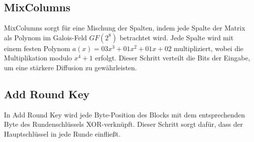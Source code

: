 \subsection{MixColumns}
MixColumns sorgt für eine Mischung der Spalten, indem jede Spalte der Matrix als Polynom im Galois-Feld \(GF(2^8)\) betrachtet wird. Jede Spalte wird mit einem festen Polynom \(a(x) = 03x^3 + 01x^2 + 01x + 02\) multipliziert, wobei die Multiplikation modulo \(x^4 + 1\) erfolgt. Dieser Schritt verteilt die Bits der Eingabe, um eine stärkere Diffusion zu gewährleisten.

\subsection{Add Round Key}
In Add Round Key wird jede Byte-Position des Blocks mit dem entsprechenden Byte des Rundenschlüssels XOR-verknüpft. Dieser Schritt sorgt dafür, dass der Hauptschlüssel in jede Runde einfließt.
